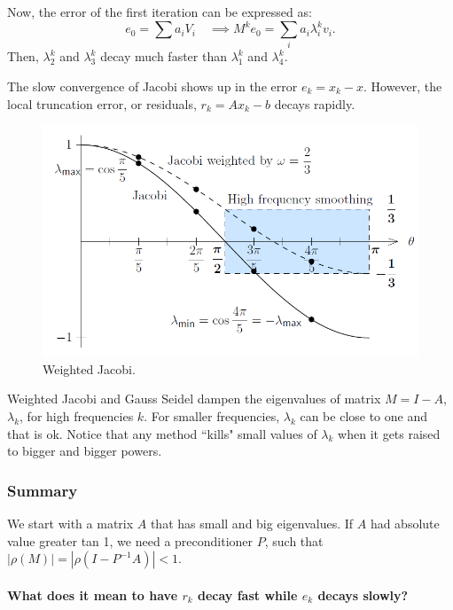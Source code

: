 \documentclass[12pt,a4paper,twoside]{article}
\begin{document}
Now, the error of the first iteration can be expressed as: 
\begin{equation}
e_0 = \sum a_iV_i \quad  \implies M^ke_0 = \sum_i a_i \lambda_i^k v_i.    
\end{equation}
Then, $\lambda_2^k$ and $\lambda_3^k$ decay much faster than $\lambda_1^k$ and $\lambda_4^k$. 

The slow convergence of Jacobi shows up in the error $e_k=x_k-x$. However, the local truncation error, or residuals, $r_k = Ax_k-b$ decays rapidly. 

\begin{figure}[H]
    \centering
    \includegraphics{jacobi_eigenvalues.png}
    \caption{Weighted Jacobi.}
    \label{fig:my_label}
\end{figure}
Weighted Jacobi and Gauss Seidel dampen the eigenvalues of matrix $M= I-A$, $\lambda_k$, for high frequencies $k$. For smaller frequencies, $\lambda_k$ can be close to one and that is ok. 
Notice that any method ``kills" small values of $\lambda_k$ when it gets raised to bigger and bigger powers.

\subsubsection{Summary}
We start with a matrix $A$ that has small and big eigenvalues. 
If $A$ had absolute value greater tan 1, we need a preconditioner $P$, such that $|\rho(M)|=|\rho(I-P^{-1}A)|<1$. 

\paragraph{What does it mean to have $r_k$ decay fast while $e_k$ decays slowly? }
\end{document}
